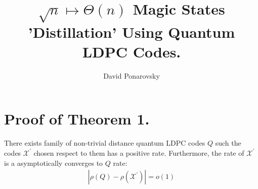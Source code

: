 \documentclass[manuscript,screen,review]{acmart}
\begin{document}

\title{ $\sqrt{n} \mapsto \Theta(n)$  Magic States 'Distillation' Using
Quantum LDPC Codes. }
\author{David Ponarovsky}
\maketitle

\newcommand*{\Mbas}{\mathcal{X}^\prime}
\newcommand*{\bas}{\mathcal{X}}
\newcommand*{\sMbas}{\Mbas}
\newcommand*{\QQ}{C_{X}/C_{Z}^\perp }
\newcommand*{\trig}{Triorthogonal }
\newcommand*{\Hyp}{Hyperproduct }
\newcommand*{\Cin}{ C_{\text{initial}} }
\newcommand*{\Ctan}{ C_{\text{Tanner}} }




\section{Proof of Theorem 1.}
\begin{claim}
  \label{claim:notempty}
  There exists family of non-trivial distance quantum LDPC codes $Q$ such the codes $\sMbas$ chosen respect to them has a positive rate. Furthermore, the rate of $\sMbas$ is a asymptotically converges to $Q$ rate:
  \begin{equation*}
    \begin{split}
      \left| \rho\left(Q\right) - \rho\left(\sMbas\right) \right| = o(1)
    \end{split}
  \end{equation*}
\end{claim}
\end{document}

